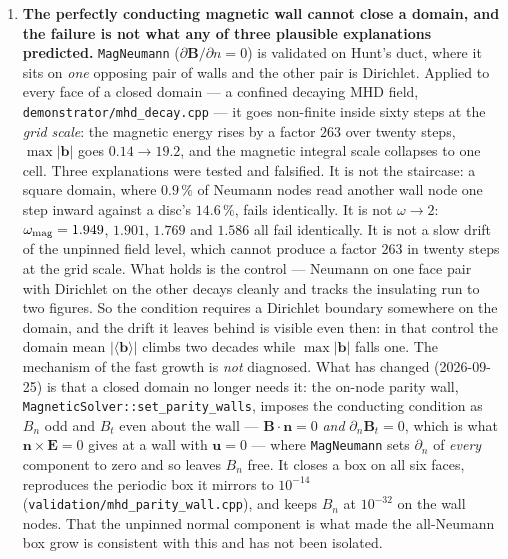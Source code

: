 \documentclass[11pt,a4paper]{article}
\newcommand{\code}[1]{\texttt{\small #1}}
\begin{document}
\begin{enumerate}[leftmargin=1.4em,itemsep=4pt]
  below onset, a steep rise, a plateau, renewed growth at $\kappa=+0.35$ --- but
  at $T=500$--$3000$, where the $N=129$ grid \emph{is} resolved
  ($\mathrm{Re}_{\rm cell}\le2.3$), the level sits low. Mach number is excluded
  ($3\,\%$), the seed is excluded by the unseeded sweep, and the wall columns
  contribute under $1\,\%$. Resolution is \emph{not} excluded there and cannot be
  from this implementation, since the reference's $500^2$ costs about five hours
  per $T$ on one machine. At the top of the range it has now been run on a
  device (\S\ref{sec:cudaehd}) and the deficit does not survive: $N_e=3.10\pm0.41$
  against $2.80$. A matched-resolution comparison across the whole sweep has
  still not been made.

\item \textbf{The perfectly conducting magnetic wall cannot close a domain,
  and the failure is not what any of three plausible explanations predicted.}
  \code{MagNeumann} ($\partial\bm{B}/\partial n=0$) is validated on Hunt's duct,
  where it sits on \emph{one} opposing pair of walls and the other pair is
  Dirichlet. Applied to every face of a closed domain --- a confined decaying
  MHD field, \code{demonstrator/mhd\_decay.cpp} --- it goes non-finite inside
  sixty steps at the \emph{grid scale}: the magnetic energy rises by a factor
  $263$ over twenty steps, $\max|\bm{b}|$ goes $0.14\to19.2$, and the magnetic
  integral scale collapses to one cell. Three explanations were tested and
  falsified. It is not the staircase: a square domain, where $0.9\,\%$ of
  Neumann nodes read another wall node one step inward against a disc's
  $14.6\,\%$, fails identically. It is not $\omega\to2$: $\omega_{\rm mag}=
  1.949$, $1.901$, $1.769$ and $1.586$ all fail identically. It is not a slow
  drift of the unpinned field level, which cannot produce a factor $263$ in
  twenty steps at the grid scale. What holds is the control --- Neumann on one
  face pair with Dirichlet on the other decays cleanly and tracks the insulating
  run to two figures. So the condition requires a Dirichlet boundary somewhere
  on the domain, and the drift it leaves behind is visible even then: in that
  control the domain mean $|\langle\bm{b}\rangle|$ climbs two decades while
  $\max|\bm{b}|$ falls one. The mechanism of the fast growth is \emph{not}
  diagnosed. What has changed (2026-09-25) is that a closed domain no longer
  needs it: the on-node parity wall, \code{MagneticSolver::set\_parity\_walls},
  imposes the conducting condition as $B_n$ odd and $B_t$ even about the wall
  --- $\bm{B}\!\cdot\!\bm{n}=0$ \emph{and} $\partial_n\bm{B}_t=0$, which is what
  $\bm{n}\times\bm{E}=0$ gives at a wall with $\bm{u}=0$ --- where
  \code{MagNeumann} sets $\partial_n$ of \emph{every} component to zero and so
  leaves $B_n$ free. It closes a box on all six faces, reproduces the periodic
  box it mirrors to $10^{-14}$ (\code{validation/mhd\_parity\_wall.cpp}), and
  keeps $B_n$ at $10^{-32}$ on the wall nodes. That the unpinned normal
  component is what made the all-Neumann box grow is consistent with this and
  has not been isolated.


\end{enumerate}
\end{document}
